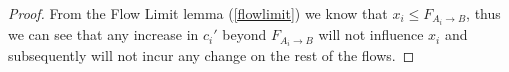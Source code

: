 \begin{proof}
   From the Flow Limit lemma (\ref{flowlimit}) we know that $x_i \leq F_{A_i \rightarrow B}$, thus we can see that any increase in $c_i'$
   beyond $F_{A_i \rightarrow B}$ will not influence $x_i$ and subsequently will not incur any change on the rest of the flows.
\end{proof}
